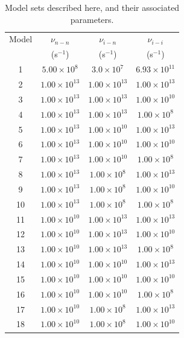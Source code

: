 \documentclass[journal=aesccq,manuscript=article,layout=twocolumn]{achemso}
\begin{document}
\begin{table}[p!]
  \centering
    \footnotesize
  \caption{Model sets described here, and their associated parameters.}
  \label{tbl:parameters}
  \begin{tabular}{cccc}
    \hline
     Model & $\nu_{n-n}$  & $\nu_{i-n}$ & $\nu_{i-i}$ \\
     & (s$^{-1}$)   &   (s$^{-1}$)&   (s$^{-1}$)\\                
    \hline
    1 & $5.00\times10^{8}$  & $3.0\times10^{7}$ & $6.93\times10^{11}$ \\
2  & \(1.00 \times 10^{13}\) & \(1.00 \times 10^{13}\) & \(1.00 \times 10^{13}\) \\
3  & \(1.00 \times 10^{13}\) & \(1.00 \times 10^{13}\) & \(1.00 \times 10^{10}\) \\
4  & \(1.00 \times 10^{13}\) & \(1.00 \times 10^{13}\) & \(1.00 \times 10^{8}\) \\
5  & \(1.00 \times 10^{13}\) & \(1.00 \times 10^{10}\) & \(1.00 \times 10^{13}\) \\
6  & \(1.00 \times 10^{13}\) & \(1.00 \times 10^{10}\) & \(1.00 \times 10^{10}\) \\
7  & \(1.00 \times 10^{13}\) & \(1.00 \times 10^{10}\) & \(1.00 \times 10^{8}\) \\
8  & \(1.00 \times 10^{13}\) & \(1.00 \times 10^{8}\) & \(1.00 \times 10^{13}\) \\
9  & \(1.00 \times 10^{13}\) & \(1.00 \times 10^{8}\) & \(1.00 \times 10^{10}\) \\
10 & \(1.00 \times 10^{13}\) & \(1.00 \times 10^{8}\) & \(1.00 \times 10^{8}\) \\
11 & \(1.00 \times 10^{10}\) & \(1.00 \times 10^{13}\) & \(1.00 \times 10^{13}\) \\
12 & \(1.00 \times 10^{10}\) & \(1.00 \times 10^{13}\) & \(1.00 \times 10^{10}\) \\
13 & \(1.00 \times 10^{10}\) & \(1.00 \times 10^{13}\) & \(1.00 \times 10^{8}\) \\
14 & \(1.00 \times 10^{10}\) & \(1.00 \times 10^{10}\) & \(1.00 \times 10^{13}\) \\
15 & \(1.00 \times 10^{10}\) & \(1.00 \times 10^{10}\) & \(1.00 \times 10^{10}\) \\
16 & \(1.00 \times 10^{10}\) & \(1.00 \times 10^{10}\) & \(1.00 \times 10^{8}\) \\
17 & \(1.00 \times 10^{10}\) & \(1.00 \times 10^{8}\) & \(1.00 \times 10^{13}\) \\
18 & \(1.00 \times 10^{10}\) & \(1.00 \times 10^{8}\) & \(1.00 \times 10^{10}\) \\

\end{tabular}
\end{table}
\end{document}
